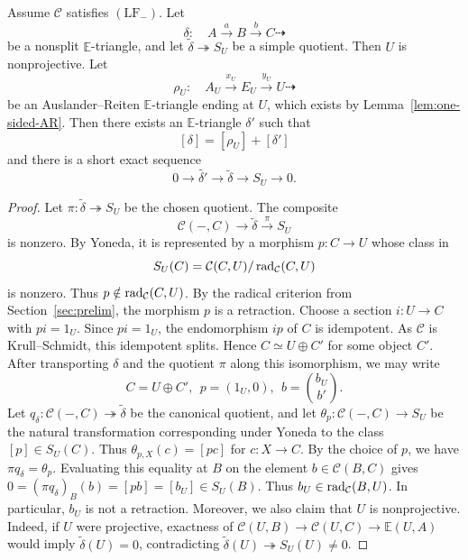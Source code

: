 \documentclass[11pt, twoside]{article}
\def\C{\mathcal{C}}
\def\E{\mathbb{E}}
\numberwithin{equation}{section}
\begin{document}
\begin{lemma}\label{lem:defect-reduction}
Assume $\C$ satisfies $(\mathrm{LF}_-)$.  Let
\[
 \delta:\quad A\xrightarrow{a}B\xrightarrow{b}C\dashrightarrow
\]
be a nonsplit $\E$-triangle, and let
$\widetilde\delta\twoheadrightarrow S_U$ be a simple quotient.  Then $U$ is
nonprojective.  Let
\[
 \rho_U:\quad A_U\xrightarrow{x_U}E_U\xrightarrow{y_U}U\dashrightarrow
\]
be an Auslander--Reiten $\E$-triangle ending at $U$, which exists by
{\rm Lemma~\ref{lem:one-sided-AR}}.  Then there exists an $\E$-triangle $\delta'$ such that
\[
 [\delta]=[\rho_U]+[\delta']
\]
and there is a short exact sequence
\[
 0\longrightarrow\widetilde{\delta'}\longrightarrow
 \widetilde\delta\longrightarrow S_U\longrightarrow0.
\]
\end{lemma}

\begin{proof}
Let $\pi:\widetilde\delta\twoheadrightarrow S_U$ be the chosen quotient.
The composite
\[
 \C(-,C)\longrightarrow\widetilde\delta\xrightarrow{\pi}S_U
\]
is nonzero.  By Yoneda, it is represented by a morphism $p:C\to U$ whose
class in
\[
 S_U(C)=\C(C,U)/\rad_\C(C,U)
\]
is nonzero.  Thus $p\notin\rad_\C(C,U)$. By the radical criterion from Section~\ref{sec:prelim}, the morphism $p$ is a retraction.  Choose a section
$i:U\to C$ with $pi=1_U$.  Since $pi=1_U$, the endomorphism $ip$ of $C$ is idempotent. As $\C$ is Krull--Schmidt, this idempotent splits. Hence $C\simeq U\oplus C'$ for some object $C'$.
After transporting $\delta$ and the quotient $\pi$ along this isomorphism,
we may write
\[
 C=U\oplus C',~~ p=(1_U,0),~~
 b=\binom{b_U}{b'}.
\]
Let $q_\delta\colon\C(-,C)\twoheadrightarrow\widetilde\delta$ be the canonical
quotient, and let $\theta_p:\C(-,C)\to S_U$ be the natural transformation
corresponding under Yoneda to the class $[p]\in S_U(C)$.  Thus
$\theta_{p,X}(c)=[pc]$ for $c:X\to C$.  By the choice of $p$, we have
$\pi q_\delta=\theta_p$.  Evaluating this equality at $B$ on the element
$b\in\C(B,C)$ gives
$
 0=(\pi q_\delta)_B(b)=[pb]=[b_U]\in S_U(B).
$
Thus $b_U\in\rad_\C(B,U)$. In particular, $b_U$ is not a retraction.  Moreover,
we also claim that $U$ is nonprojective. Indeed, if $U$ were projective, exactness of
$\C(U,B)\to\C(U,C)\to\E(U,A)$ would imply
$\widetilde\delta(U)=0$, contradicting
$\widetilde\delta(U)\twoheadrightarrow S_U(U)\ne0$.


\end{proof}
\end{document}
